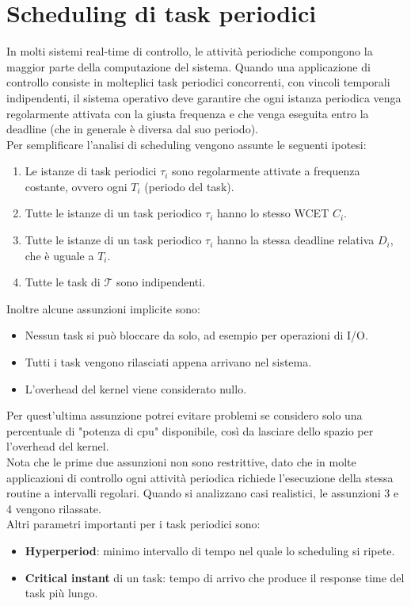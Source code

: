 \documentclass[12pt,openany,onesided]{book}
\begin{document}
\chapter{Scheduling di task periodici}
In molti sistemi real-time di controllo, le attività periodiche compongono la maggior parte della computazione del sistema.
Quando una applicazione di controllo consiste in molteplici task periodici concorrenti, con vincoli temporali indipendenti, il sistema operativo deve garantire che ogni istanza periodica 
venga regolarmente attivata con la giusta frequenza e che venga eseguita entro la deadline (che in generale è diversa dal suo periodo).\\
Per semplificare l'analisi di scheduling vengono assunte le seguenti ipotesi:
\begin{enumerate}
    \label{assunzioni}
    \item Le istanze di task periodici $\tau_i$ sono regolarmente attivate a frequenza costante, ovvero ogni $T_i$ (periodo del task).
    \item Tutte le istanze di un task periodico $\tau_i$ hanno lo stesso WCET $C_i$.
    \item Tutte le istanze di un task periodico $\tau_i$ hanno la stessa deadline relativa $D_i$, che è uguale a $T_i$.
    \item Tutte le task di $\mathcal{T}$ sono indipendenti.
\end{enumerate}
Inoltre alcune assunzioni implicite sono:
\begin{itemize}
    \item Nessun task si può bloccare da solo, ad esempio per operazioni di I/O.
    \item Tutti i task vengono rilasciati appena arrivano nel sistema.
    \item L'overhead del kernel viene considerato nullo.
\end{itemize}
Per quest'ultima assunzione potrei evitare problemi se considero solo una percentuale di "potenza di cpu" disponibile, così da lasciare dello spazio per l'overhead del kernel.\\
Nota che le prime due assunzioni non sono restrittive, dato che in molte applicazioni di controllo ogni attività periodica richiede l'esecuzione della stessa routine a intervalli regolari.
Quando si analizzano casi realistici, le assunzioni 3 e 4 vengono rilassate.
\\
Altri parametri importanti per i task periodici sono:
\begin{itemize}
    \item \textbf{Hyperperiod}: minimo intervallo di tempo nel quale lo scheduling si ripete.
    \item \textbf{Critical instant} di un task: tempo di arrivo che produce il response time del task più lungo.
\end{itemize}
\end{document}
